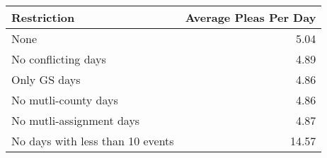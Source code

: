 \begin{tabular}{lr}
\toprule
                     Restriction &  Average Pleas Per Day \\
\midrule
                            None &                   5.04 \\
             No conflicting days &                   4.89 \\
                    Only GS days &                   4.86 \\
            No mutli-county days &                   4.86 \\
        No mutli-assignment days &                   4.87 \\
No days with less than 10 events &                  14.57 \\
\bottomrule
\end{tabular}
